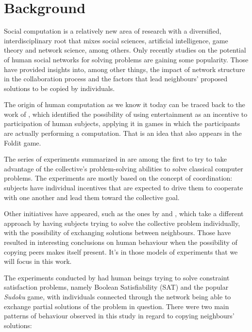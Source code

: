 \documentclass{article}
\begin{document}
\section{Background}

Social computation is a relatively new area of research with a diversified, interdisciplinary root that mixes social sciences, artificial intelligence, game theory and network science, among others. Only recently studies on the potential of human social networks for solving problems are gaining some popularity. Those have provided insights into, among other things, the impact of network structure in the collaboration process and the factors that lead neighbours' proposed solutions to be copied by individuals.

The origin of human computation as we know it today can be traced back to the work of \cite{vonahm:gwap}, which identified the possibility of using entertainment as an incentive to participation of human subjects, applying it in games in which the participants are actually performing a computation. That is an idea that also appears in the Foldit game.

The series of experiments summarized in \cite{kearns:experim} are among the first to try to take advantage of the collective's problem-solving abilities to solve classical computer problems. The experiments are mostly based on the concept of coordination: subjects have individual incentives that are expected to drive them to cooperate with one another and lead them toward the collective goal.

Other initiatives have appeared, such as the ones by \cite{farenzena:collabem} and \cite{mason:collablearnet}, which take a different approach by having subjects trying to solve the collective problem individually, with the possibility of exchanging solutions between neighbours. Those have resulted in interesting conclusions on human behaviour when the possibility of copying peers makes itself present. It's in those models of experiments that we will focus in this work.

The experiments conducted by \cite{farenzena:collabem} had human beings trying to solve constraint satisfaction problems, namely Boolean Satisfiability (SAT) and the popular \emph{Sudoku} game, with individuals connected through the network being able to exchange partial solutions of the problem in question. There were two main patterns of behaviour observed in this study in regard to copying neighbours' solutions:
\end{document}
